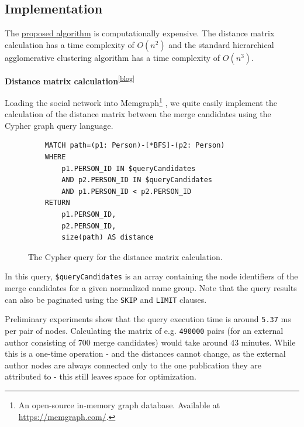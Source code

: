 \subsection{Implementation}

The \hyperref[sec:distance-based-hierarchical-clustering]{proposed algorithm} 
is computationally expensive. The distance matrix calculation has a time complexity of $O(n^2)$
and the standard hierarchical agglomerative clustering algorithm has a time complexity of $O(n^3)$.

\textbf{Distance matrix calculation}\textsuperscript{\href{https://barjin.github.io/edu/thesis-blog/inference-distance-matrix/\#distance-matrix-calculation}{[blog]}}

Loading the social network into Memgraph\footnote{An open-source in-memory graph database. Available at \url{https://memgraph.com/}.}
, we quite easily implement the calculation of the distance matrix between the merge candidates using the Cypher graph query language.

\begin{figure}[!ht]
\begin{verbatim}
    MATCH path=(p1: Person)-[*BFS]-(p2: Person)
    WHERE 
        p1.PERSON_ID IN $queryCandidates 
        AND p2.PERSON_ID IN $queryCandidates
        AND p1.PERSON_ID < p2.PERSON_ID
    RETURN 
        p1.PERSON_ID, 
        p2.PERSON_ID, 
        size(path) AS distance
\end{verbatim}
\captionsetup{width=.9\linewidth}
\caption{The Cypher query for the distance matrix calculation.\protect\footnotemark}
\label{fig:distance-matrix-calculation}
\end{figure}


In this query, \texttt{\$queryCandidates} is an array containing the node identifiers of the merge candidates for a given normalized name group.
Note that the query results can also be paginated using the \texttt{SKIP} and \texttt{LIMIT} clauses.

Preliminary experiments show that the query execution time is around \texttt{5.37} ms per pair of nodes.
Calculating the matrix of e.g. \texttt{490000} pairs (for an external author consisting of 700 merge candidates) would take around 43 minutes.
While this is a one-time operation - and the distances cannot change, as the external author nodes are always connected only to the one publication they are attributed to - this still leaves space for optimization.

